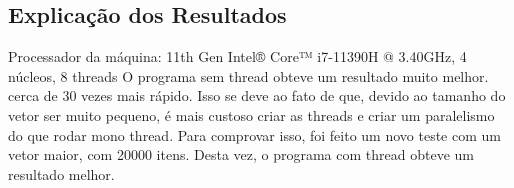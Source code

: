 \subsection*{Explicação dos Resultados}
Processador da máquina: 11th Gen Intel® Core™ i7-11390H @ 3.40GHz, 4 núcleos, 8 threads
O programa sem thread obteve um resultado muito melhor. cerca de 30 vezes mais rápido.
Isso se deve ao fato de que, devido ao tamanho do vetor ser muito pequeno, é mais custoso criar as threads e criar um paralelismo do que rodar mono thread.
Para comprovar isso, foi feito um novo teste com um vetor maior, com 20000 itens. Desta vez, o programa com thread obteve um resultado melhor.
